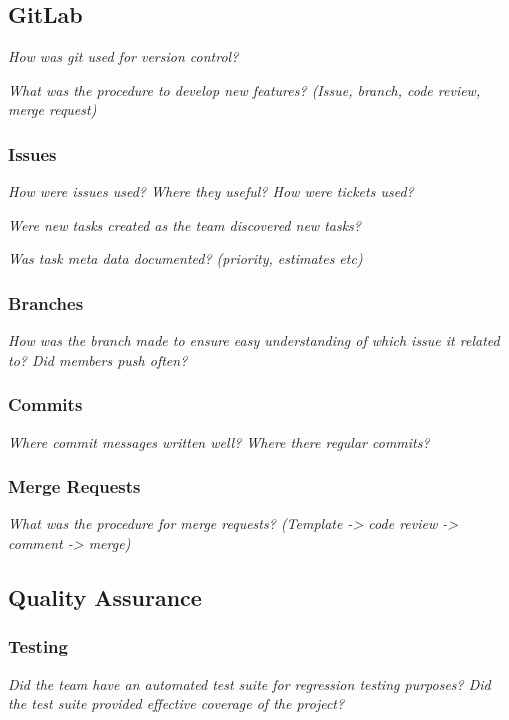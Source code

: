 \documentclass[../dissertation.tex]{subfiles}
\begin{document}
\subsection{GitLab}

\textit{How was git used for version control?}

\textit{What was the procedure to develop new features? (Issue, branch, code review, merge request)}

\subsubsection{Issues}

\textit{How were issues used? Where they useful? How were tickets used?}

\textit{Were new tasks created as the team discovered new tasks?}

\textit{Was task meta data documented? (priority, estimates etc)}

\subsubsection{Branches}

\textit{How was the branch made to ensure easy understanding of which issue it related to? Did members push often?}

\subsubsection{Commits}

\textit{Where commit messages written well? Where there regular commits?}

\subsubsection{Merge Requests}

\textit{What was the procedure for merge requests? (Template -> code review -> comment -> merge)}

\subsection{Quality Assurance}

\subsubsection{Testing}

\textit{Did the team have an automated test suite for regression testing purposes? Did the test suite provided effective coverage of the project?}
\end{document}
